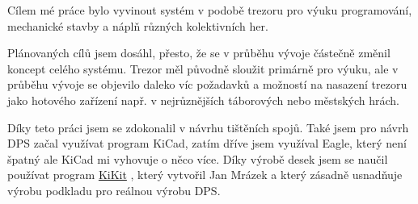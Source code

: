 Cílem mé práce bylo vyvinout systém v podobě trezoru pro výuku programování, mechanické stavby a náplň různých kolektivních her. 

Plánovaných cílů jsem dosáhl, přesto, že se v průběhu vývoje částečně změnil koncept celého systému. Trezor měl původně sloužit primárně pro výuku, ale v průběhu vývoje 
se objevilo daleko víc požadavků a možností na nasazení trezoru jako hotového zařízení např. v nejrůznějších táborových nebo městských hrách. 



Díky teto práci jsem se zdokonalil v návrhu tištěních spojů. Také jsem pro návrh DPS začal využívat program KiCad, zatím dříve jsem využíval Eagle, který není špatný ale KiCad 
mi vyhovuje o něco více. Díky výrobě desek jsem se naučil používat program \href{https://github.com/yaqwsx/KiKit}{KiKit} \parencite{KiKit}, 
který vytvořil Jan Mrázek a který zásadně usnadňuje výrobu podkladu pro reálnou výrobu DPS.


